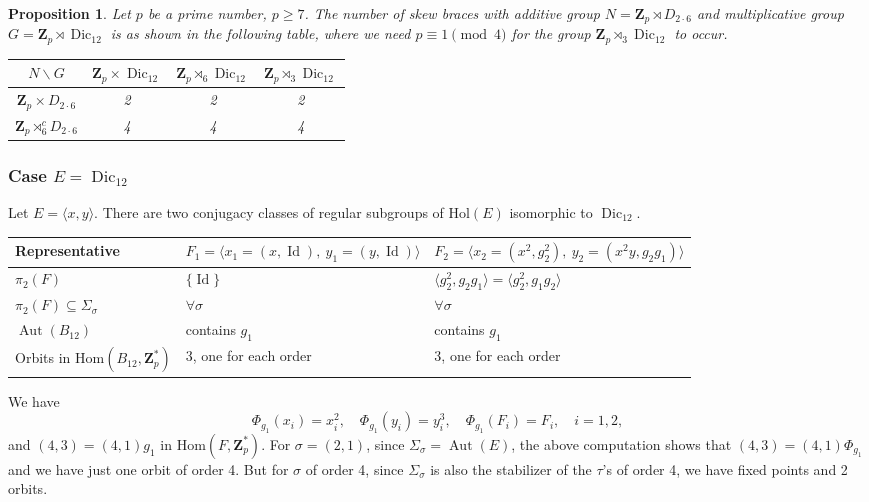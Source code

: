 \documentclass[12pt]{article}
\newtheorem{proposition}[theorem]{Proposition}
\theoremstyle{definition}
\newcommand{\Z}{\mathbf Z}
\newcommand{\Hol}{\mathrm{Hol}}
\newcommand{\Hom}{\mathrm{Hom}}
\newcommand{\Aut}{\operatorname{Aut}}
\newcommand{\Id}{\operatorname{Id}}
\newcommand{\Dic}{\operatorname{Dic}}
\begin{document}
\begin{proposition}
	Let $p$ be a prime number, $p\geq 7$. The number of skew braces with additive group $N=\Z_p \rtimes D_{2\cdot6}$ and multiplicative group $G=\Z_p\rtimes \Dic_{12}$ is as shown in the following table, where we need $p\equiv 1 \pmod{4}$ for the group  $\Z_p\rtimes_{3} \Dic_{12}$ to occur.
	
	\begin{center}
		\begin{tabular}{|c||c|c|c|}
			\hline
			$N \backslash G$ & $\Z_p\times \Dic_{12}$ & $\Z_p\rtimes_{6} \Dic_{12}$ & $\Z_p\rtimes_{3} \Dic_{12}$  \\
			\hline
			\hline
			$\Z_p \times D_{2\cdot6}$ &2&2&2\\
			\hline
			$\Z_p \rtimes_6^c D_{2\cdot6}$ &4&4&4\\
			\hline
			
			
		\end{tabular}
	\end{center}
	
\end{proposition}


\subsubsection*{Case $E=\Dic_{12}$}

Let $E=\langle x, y\rangle$. There are two conjugacy classes of regular subgroups of $\Hol(E)$ isomorphic to $\Dic_{12}$. 


\begin{center}
    \begin{tabular}{|l|l|l|}
    \hline
     Representative & $F_1=\langle x_1=(x,\Id),\  y_1=(y,\Id)\rangle$ &
     $F_2=\langle x_2=(x^2,g_2^2),\ y_2=(x^2 y,g_2 g_1)\rangle$\\
   \hline
   $\pi_2(F)$
     & $\{\Id \}$ & 
     $\langle g_2^2, g_2 g_1\rangle=\langle g_2^2, g_1g_2\rangle$ \\
     $\pi_2(F)\subseteq \Sigma_{\sigma}$& 
     $\forall \sigma$  &  $\forall\sigma$ \\
     $\Aut(B_{12})$ & contains $g_1$ & contains $g_1$\\
     Orbits in $\Hom(B_{12},\Z_p^*)$ & 3, one for each order &3, one for each order \\ \hline
    \end{tabular}
\end{center}    

We have
$$
\Phi_{g_1}(x_i)=x_i^2,\quad \Phi_{g_1}(y_i)=y_i^3,
\quad \Phi_{g_1}(F_i)=F_i, \quad i=1,2,
$$
and $(4,3)=(4,1)g_1 \mbox{ in } \Hom(F,\Z_p^*).$ For $\sigma=(2,1)$, since $\Sigma_{\sigma}=\Aut(E)$, the above computation shows
that  $(4,3)=(4,1)\Phi_{g_1}$ and we have just one orbit of order 4.
But for $\sigma$ of order 4, since $\Sigma_{\sigma}$ is also the stabilizer of the $\tau$'s of order 4, we have fixed points and 2 orbits.
\end{document}
